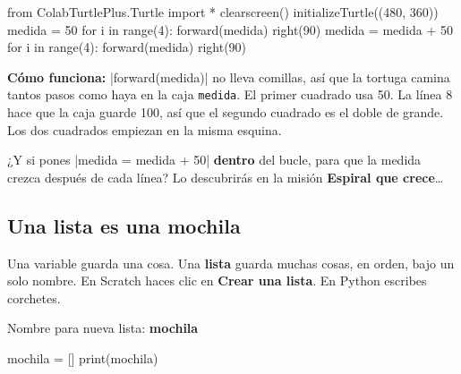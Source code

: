 \noindent\begin{minipage}[t]{0.37\linewidth}\vspace{0pt}
\begin{scratch}
\end{scratch}
\end{minipage}\hfill\begin{minipage}[t]{0.61\linewidth}\vspace{0pt}
\begin{code}
from ColabTurtlePlus.Turtle import *
clearscreen()
initializeTurtle((480, 360))
medida = 50
for i in range(4):
    forward(medida)
    right(90)
medida = medida + 50
for i in range(4):
    forward(medida)
    right(90)
\end{code}
\end{minipage}

\textbf{Cómo funciona:} \py|forward(medida)| no lleva comillas, así que la tortuga camina tantos pasos como haya en la caja \texttt{medida}. El primer cuadrado usa 50. La línea 8 hace que la caja guarde 100, así que el segundo cuadrado es el doble de grande. Los dos cuadrados empiezan en la misma esquina.

¿Y si pones \py|medida = medida + 50| \textbf{dentro} del bucle, para que la medida crezca después de cada línea? Lo descubrirás en la misión \textbf{Espiral que crece}\ldots

\subsection*{Una lista es una mochila}

Una variable guarda una cosa. Una \textbf{lista} guarda muchas cosas, en orden, bajo un solo nombre. En Scratch haces clic en \textbf{Crear una lista}. En Python escribes corchetes.

\begin{tcbraster}[raster columns=2, raster equal height=rows, raster column skip=12pt, raster valign=center]
\begin{tcolorbox}[colback=white, colframe=white, boxrule=0pt, valign=center, halign=center]
\par\medskip
Nombre para nueva lista: \textbf{mochila}
\end{tcolorbox}
\begin{code}
mochila = []
print(mochila)
\end{code}
\end{tcbraster}


